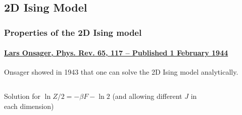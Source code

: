 \documentclass[hyperref={colorlinks=true}]{beamer}
\begin{document}
\begin{frame}
\end{frame}

\subsection[2D Ising Model]{2D Ising Model}


\begin{frame}%
  \frametitle{Properties of the 2D Ising model}
  \framesubtitle{\href{https://journals.aps.org/pr/abstract/10.1103/PhysRev.65.117}{Lars Onsager, Phys. Rev. 65, 117 -- Published 1 February 1944}}

  Onsager showed in 1943 that one can solve the 2D Ising model analytically.
  
  
  \begin{columns}
  
    
      Solution for $\ln {Z/2} = -\beta F - \ln 2$ (and allowing different $J$ in each dimension)
      
      \begin{figure}
      \end{figure}
      

\end{columns}
\end{frame}
\end{document}
